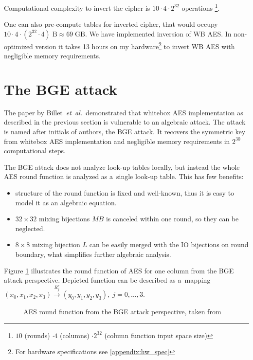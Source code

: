 \documentclass[11pt,oneside,final]{fithesis2}
\newcommand{\eal}{\emph{et~al.}}
\begin{document}
    Computational complexity to invert the cipher
    is $10 \cdot 4 \cdot 2^{32}$ operations \footnote{ $10$ (rounds) $\cdot 4$ (columns) $ \cdot 2^{32}$ (column function input space size)}.
    
    One can also pre-compute tables for inverted cipher, that would occupy $10 \cdot 4 \cdot (2^{32} \cdot 4)\;\text{B} \approx 69\;\text{GB}$.
    We have implemented inversion of WB AES. In non-optimized version it takes 13 hours on my hardware\footnote{For hardware specifications see \ref{appendix:hw_spec}} 
    to invert WB AES with negligible memory requirements.

    \section{The BGE attack}\label{sec:bge_attack}
    The paper \citep{Billet:2004:CWB:2080787.2080809} by Billet~\eal~demonstrated that whitebox AES implementation as described in the previous section is vulnerable
    to an algebraic attack. The attack is named after initials of authors, the BGE attack. It recovers the symmetric key from whitebox AES implementation and
    negligible memory requirements in $2^{30}$ computational steps.
    
    The BGE attack does not analyze look-up tables locally, but instead the whole AES round function is analyzed as a~single look-up table. This has few benefits:
    \begin{itemize}
     \item structure of the round function is fixed and well-known, thus it is easy to model it as an algebraic equation.
     \item $32\times32$ mixing bijections $MB$ is canceled within one round, so they can be neglected.
     \item $8\times8$ mixing bijection $L$ can be easily merged with the IO bijections on round boundary, what simplifies further algebraic analysis. 
    \end{itemize}
    
    Figure \ref{fig:aes_round_bge} illustrates the round function of AES for one column from the BGE attack perspective. Depicted function can 
    be described as a~mapping $\left(x_0, x_1, x_2, x_3\right) \xrightarrow{R^r_j} \left(y_0, y_1, y_2, y_3\right), \; j=0,\dots,3$.   
    
    \begin{figure}
    \begin{center}
    \leavevmode
    \centerline{}
    \end{center}
    \caption{AES round function from the BGE attack perspective, taken from \citep{Billet:2004:CWB:2080787.2080809}}
    \label{fig:aes_round_bge}
    \end{figure} 
\end{document}
